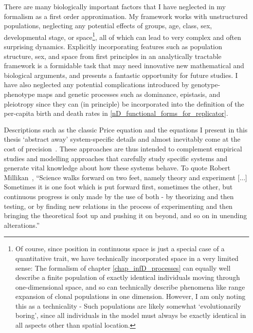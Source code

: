 There are many biologically important factors that I have neglected in my formalism as a first order approximation. My framework works with unstructured populations, neglecting any potential effects of groups, age, class, sex, developmental stage, or space\footnote{Of course,  since position in continuous space is just a special case of a quantitative trait, we have technically incorporated space in a very limited sense: The formalism of chapter \ref{chap_infD_processes} can equally well describe a finite population of exactly identical individuals moving through one-dimensional space, and so can technically describe phenomena like range expansion of clonal populations in one dimension. However, I am only noting this as a technicality - Such populations are likely somewhat `evolutionarily boring', since all individuals in the model must always be exactly identical in all aspects other than spatial location.}, all of which can lead to very complex and often surprising dynamics. Explicitly incorporating features such as population structure, sex, and space from first principles in an analytically tractable framework is a formidable task that may need innovative new mathematical and biological arguments, and presents a fantastic opportunity for future studies. I have also neglected any potential complications introduced by genotype-phenotype maps and genetic processes such as dominance, epistasis, and pleiotropy since they can (in principle) be incorporated into the definition of the per-capita birth and death rates in \eqref{nD_functional_forms_for_replicator}.

Descriptions such as the classic Price equation and the equations I present in this thesis `abstract away' system-specific details and almost inevitably come at the cost of precision~\citep{levins_strategy_1966, potochnik_idealization_2018}. These approaches are thus intended to complement empirical studies and modelling approaches that carefully study specific systems and generate vital knowledge about how these systems behave. To quote Robert Millikan~\citep{millikan_electron_1924}, ``Science walks forward on two feet, namely theory and experiment [...] Sometimes it is one foot which is put forward first, sometimes the other, but continuous progress is only made by the use of both - by theorizing and then testing, or by finding new relations in the process of experimenting and then bringing the theoretical foot up and pushing it on beyond, and so on in unending alterations.''